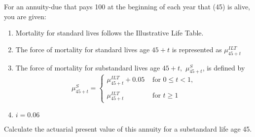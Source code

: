 For an annuity-due that pays 100 at the beginning of each year that (45) is alive, you are given:
\begin{enumerate}
\item       Mortality for standard lives follows the Illustrative Life Table.
\item     The force of mortality for standard lives age $45 + t$  is represented as $\mu_{45+t}^{\scriptscriptstyle ILT}$
\item      The force of mortality for substandard lives age $45 + t ,$ $\mu_{45+t}^{\scriptscriptstyle S}$, is defined by 
  \[  \mu_{45+t}^{\scriptscriptstyle S} =  \left\{\begin{array}{ll}
          \mu_{45+t}^{\scriptscriptstyle ILT} + 0.05 & \mbox{ for } 0\leq t < 1, \\ \\ \mu_{45+t}^{\scriptscriptstyle ILT} & \mbox{ for }t\geq 1 \end{array}\right.
  \]
\item      $i = 0.06$
\end{enumerate}
Calculate the actuarial present value of this annuity for a substandard life age 45.

